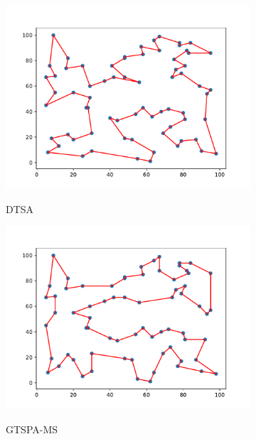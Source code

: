 \documentclass[12pt]{article}
\theoremstyle{plain}
\theoremstyle{definition}
\theoremstyle{remark}
\begin{document}
\begin{figure}[ht]
	\centering
	\begin{subfigure}{.5\textwidth}
		\centering
		\includegraphics[scale = 0.44]{../../Implementation/gen/best_path_dtsa_st70}
		\label{fig:best_path_dtsa_st70}
		\caption{DTSA}
	\end{subfigure}%
	\begin{subfigure}{.5\textwidth}
		\centering
		\includegraphics[scale = 0.44]{../../Implementation/gen/best_path_gtspams_st70}
		\label{fig:best_path_gtspams_st70}
		\caption{GTSPA-MS}
	\end{subfigure}
	\begin{subfigure}{.5\textwidth}
		\centering

\end{subfigure}
\end{figure}
\end{document}
